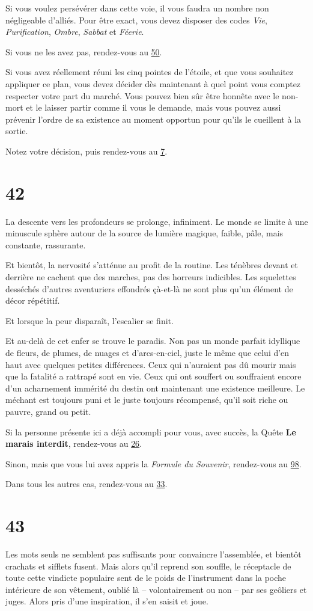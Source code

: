 \documentclass{report}
\newcommand{\gsection}[1]{
    \section{#1}
    \label{section-#1}
}
\newcommand{\glink}[1]{\hyperref[section-#1]{#1}}
\begin{document}
Si vous voulez persévérer dans cette voie, il vous faudra un nombre non négligeable d'alliés. Pour être exact, vous devez disposer des codes \emph{Vie}, \emph{Purification}, \emph{Ombre}, \emph{Sabbat} et \emph{Féerie}.

Si vous ne les avez pas, rendez-vous au \glink{50}.

Si vous avez réellement réuni les cinq pointes de l'étoile, et que vous souhaitez appliquer ce plan, vous devez décider dès maintenant à quel point vous comptez respecter votre part du marché. Vous pouvez bien sûr être honnête avec le non-mort et le laisser partir comme il vous le demande, mais vous pouvez aussi prévenir l'ordre de sa existence au moment opportun pour qu'ils le cueillent à la sortie.

Notez votre décision, puis rendez-vous au \glink{7}.

\gsection{42}

La descente vers les profondeurs se prolonge, infiniment. Le monde se limite à une minuscule sphère autour de la source de lumière magique, faible, pâle, mais constante, rassurante.

Et bientôt, la nervosité s'atténue au profit de la routine. Les ténèbres devant et derrière ne cachent que des marches, pas des horreurs indicibles. Les squelettes desséchés d'autres aventuriers effondrés çà-et-là ne sont plus qu'un élément de décor répétitif.

Et lorsque la peur disparaît, l'escalier se finit.

Et au-delà de cet enfer se trouve le paradis. Non pas un monde parfait idyllique de fleurs, de plumes, de nuages et d'arcs-en-ciel, juste le même que celui d'en haut avec quelques petites différences. Ceux qui n'auraient pas dû mourir mais que la fatalité a rattrapé sont en vie. Ceux qui ont souffert ou souffraient encore d'un acharnement immérité du destin ont maintenant une existence meilleure. Le méchant est toujours puni et le juste toujours récompensé, qu'il soit riche ou pauvre, grand ou petit.

Si la personne présente ici a déjà accompli pour vous, avec succès, la Quête \textbf{Le marais interdit}, rendez-vous au \glink{26}.

Sinon, mais que vous lui avez appris la \emph{Formule du Souvenir}, rendez-vous au \glink{98}.

Dans tous les autres cas, rendez-vous au \glink{33}.

\gsection{43}

Les mots seuls ne semblent pas suffisants pour convaincre l'assemblée, et bientôt crachats et sifflets fusent. Mais alors qu'il reprend son souffle, le réceptacle de toute cette vindicte populaire sent de le poids de l'instrument dans la poche intérieure de son vêtement, oublié là – volontairement ou non – par ses geôliers et juges. Alors pris d'une inspiration, il s'en saisit et joue.
\end{document}
